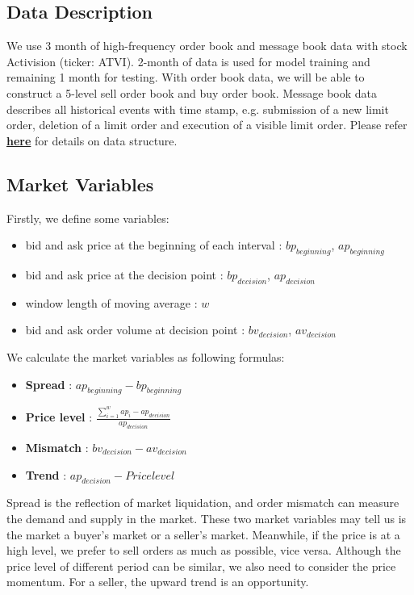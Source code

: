 \documentclass[12pt]{extarticle}
\begin{document}
\subsection{Data Description}
We use 3 month of high-frequency order book and message book data with stock Activision (ticker: ATVI). 2-month of data is used for model training and remaining 1 month for testing.
With order book data, we will be able to construct a 5-level sell order book and buy order book.
Message book data describes all historical events with time stamp, e.g. submission of a new limit order, deletion of a limit order and execution of a visible limit order. Please refer \href{https://lobsterdata.com/info/DataStructure.php}{\textbf{here}}
for details on data structure.

\subsection{Market Variables} \label{market-variables}

Firstly, we define some variables:
\begin{itemize}
  \item bid and ask price at the beginning of each interval : $bp_{beginning}$, $ap_{beginning}$
  \item bid and ask price at the decision point : $bp_{decision}$, $ap_{decision}$
  \item window length of moving average : $w$
  \item bid and ask order volume at decision point : $bv_{decision}$, $av_{decision}$
\end{itemize}
We calculate the market variables as following formulas:
\begin{itemize}
\item \textbf{Spread} : $ap_{beginning} - bp_{beginning}$
\item \textbf{Price level} : $\frac{\sum_{i=1}^{w}ap_i - ap_{decision}}{ap_{decision}}$
\item \textbf{Mismatch} : $bv_{decision} - av_{decision}$
\item \textbf{Trend} : $ap_{decision} - Price level$
\end{itemize}

\noindent Spread is the reflection of market liquidation, and order mismatch can measure the demand and supply in the market. These two market variables may tell us is the market a buyer's market or a seller's market. Meanwhile, if the price is at a high level, we prefer to sell orders as much as possible, vice versa. Although the price level of different period can be similar, we also need to consider the price momentum. For a seller, the upward trend is an opportunity.
\end{document}
